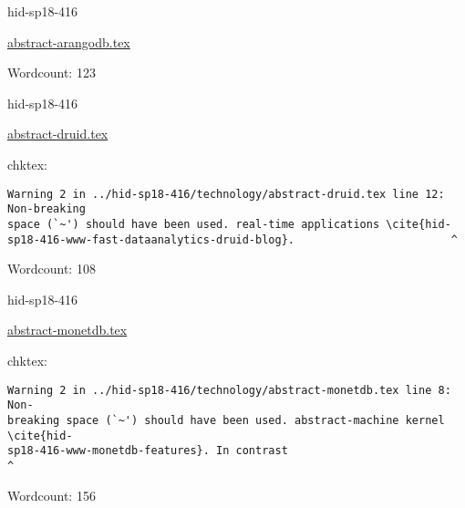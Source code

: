 

\begin{IU}

hid-sp18-416

\href{https://github.com/cloudmesh-community/hid-sp18-416/blob/master//technology/abstract-arangodb.tex}{abstract-arangodb.tex}

 

Wordcount: 123

\end{IU}



\begin{IU}

hid-sp18-416

\href{https://github.com/cloudmesh-community/hid-sp18-416/blob/master//technology/abstract-druid.tex}{abstract-druid.tex}

 
chktex:
\begin{tiny}
\begin{verbatim}
Warning 2 in ../hid-sp18-416/technology/abstract-druid.tex line 12: Non-breaking
space (`~') should have been used. real-time applications \cite{hid-
sp18-416-www-fast-dataanalytics-druid-blog}.                        ^
\end{verbatim}
\end{tiny}

Wordcount: 108

\end{IU}



\begin{IU}

hid-sp18-416

\href{https://github.com/cloudmesh-community/hid-sp18-416/blob/master//technology/abstract-monetdb.tex}{abstract-monetdb.tex}

 
chktex:
\begin{tiny}
\begin{verbatim}
Warning 2 in ../hid-sp18-416/technology/abstract-monetdb.tex line 8: Non-
breaking space (`~') should have been used. abstract-machine kernel \cite{hid-
sp18-416-www-monetdb-features}. In contrast                           ^
\end{verbatim}
\end{tiny}

Wordcount: 156

\end{IU}

